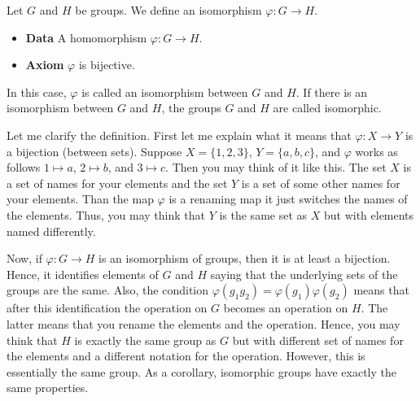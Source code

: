 \begin{definition}
\label{def::IsomorphismGr}
Let $G$ and $H$ be groups.
We define an isomorphism $\varphi \colon G\to H$.
\begin{itemize}
\item \textbf{Data} A homomorphism $\varphi \colon G\to H$.

\item \textbf{Axiom} $\varphi$ is bijective.
\end{itemize}
In this case, $\varphi$ is called an isomorphism between $G$ and $H$.
If there is an isomorphism between $G$ and $H$, the groups $G$ and $H$ are called isomorphic.
\end{definition}

Let me clarify the definition.
First let me explain what it means that $\varphi\colon X\to Y$ is a bijection (between sets).
Suppose $X = \{1, 2, 3\}$, $Y = \{a, b, c\}$, and $\varphi$ works as follows $1 \mapsto a$, $2\mapsto b$, and $3\mapsto c$.
Then you may think of it like this.
The set $X$ is a set of names for your elements and the set $Y$ is a set of some other names for your elements.
Than the map $\varphi$ is a renaming map it just switches the names of the elements.
Thus, you may think that $Y$ is the same set as $X$ but with elements named differently.

Now, if $\varphi\colon G\to H$ is an isomorphism of groups, then it is at least a bijection.
Hence, it identifies elements of $G$ and $H$ saying that the underlying sets of the groups are the same.
Also, the condition $\varphi(g_1g_2) = \varphi(g_1) \varphi(g_2)$ means that after this identification the operation on $G$ becomes an operation on $H$.
The latter means that you rename the elements and the operation.
Hence, you may think that $H$ is exactly the same group as $G$ but with different set of names for the elements and a different notation for the operation.
However, this is essentially the same group.
As a corollary, isomorphic groups have exactly the same properties.

